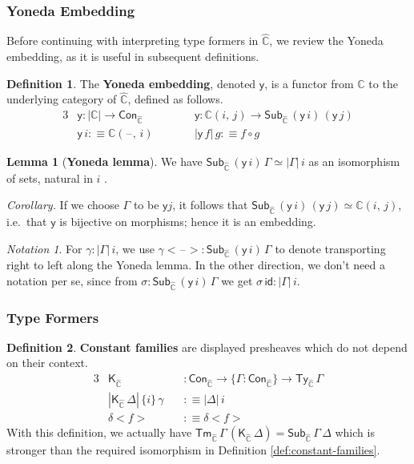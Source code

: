 \documentclass[12pt,a4paper,twoside,openany]{book}
\theoremstyle{remark}
\newtheorem{notation}{Notation}
\theoremstyle{definition}
\newtheorem{mydefinition}{Definition}
\newtheorem{mylemma}{Lemma}
\newcommand{\ms}[1]{\mathsf{#1}}
\newcommand{\mbb}[1]{\mathbb{#1}}
\newcommand{\id}{\mathsf{id}}
\newcommand{\Con}{\mathsf{Con}}
\newcommand{\Sub}{\mathsf{Sub}}
\newcommand{\Tm}{\mathsf{Tm}}
\newcommand{\Ty}{\mathsf{Ty}}
\newcommand{\blank}{\mathord{\hspace{1pt}\text{--}\hspace{1pt}}}
\newcommand{\K}{\mathsf{K}}
\newcommand{\mbbC}{\mbb{C}}
\newcommand{\hmbbC}{\hat{\mbb{C}}}
\newcommand{\lab}{<\!}
\newcommand{\rab}{\!>}
\newcommand{\defn}{:\equiv}
\newcommand{\yon}{\ms{y}}
\begin{document}
\subsubsection{Yoneda Embedding}

Before continuing with interpreting type formers in $\hmbbC$, we review the
Yoneda embedding, as it is useful in subsequent definitions.

\begin{mydefinition}
The \textbf{Yoneda embedding}, denoted $\ms{y}$, is a functor from $\mbbC$ to
the underlying category of $\hmbbC$, defined as follows.
\begin{alignat*}{3}
  & \yon : |\mbbC| \to \Con_{\hmbbC} \hspace{3em}&& \yon : \mbbC(i,\,j) \to \Sub_{\hmbbC}\,(\yon\,i)\,(\yon\,j)\\
  & \yon\,i \defn \mbbC(\blank,\,i) && |\yon\,f|\,g \defn f \circ g
\end{alignat*}
\end{mydefinition}

\begin{mylemma}[\textbf{Yoneda lemma}] We have $\Sub_{\hmbbC}\,(\yon\,i)\,\Gamma \simeq |\Gamma|\,i$ as an isomorphism of sets, natural in $i$ \cite{TODO}.
\end{mylemma}

\noindent\emph{Corollary.} If we choose $\Gamma$ to be $\yon j$, it follows that
$\Sub_{\hmbbC}\,(\yon\,i)\,(\yon\,j) \simeq \mbbC(i,\,j)$, i.e.\ that $\yon$ is
bijective on morphisms; hence it is an embedding.

\begin{notation}
For $\gamma : |\Gamma|\,i$, we use $\gamma\!\lab\!\blank\!\rab :
\Sub_{\hmbbC}\,(\yon\,i)\,\Gamma $ to denote transporting right to left along the Yoneda
lemma. In the other direction, we don't need a notation per se, since from
$\sigma : \Sub_{\hmbbC}\,(\yon\,i)\,\Gamma$ we get $\sigma\,\id :
|\Gamma|\,i$.
\end{notation}

\subsubsection{Type Formers}

\begin{mydefinition}
\textbf{Constant families} are displayed presheaves which do not depend on their context.
\begin{alignat*}{3}
  & \K_{\hmbbC} &&: \Con_{\hmbbC} \to \{\Gamma : \Con_{\hmbbC} \} \to \Ty_{\hmbbC}\,\Gamma\\
  & |\K_{\hmbbC}\,\Delta|\,\{i\}\,\gamma\,&&\defn |\Delta|\,i \\
  & \delta\lab f \rab &&\defn \delta \lab f \rab
\end{alignat*}
With this definition, we actually have $\Tm_{\hmbbC}\,\Gamma\,(\K_{\hmbbC}\,\Delta) =
\Sub_{\hmbbC}\,\Gamma\,\Delta$ which is stronger than the required isomorphism in
Definition \ref{def:constant-families}.
\end{mydefinition}
\end{document}
